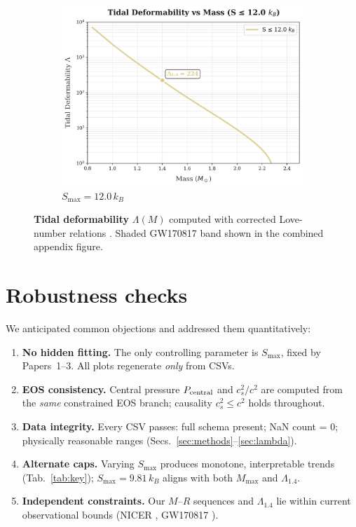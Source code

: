\documentclass[11pt]{article}
\begin{document}
\begin{figure}[h!]
\begin{subfigure}[t]{0.32\textwidth}
\includegraphics[width=\textwidth]{lambda_vs_mass_12.00kB.png}
\caption{$S_{\max}=12.0\,k_B$}
\end{subfigure}
\caption{\textbf{Tidal deformability} $\Lambda(M)$ computed with corrected Love-number relations \cite{Hinderer2008,YagiYunes2013,YagiYunes2017}. Shaded GW170817 band shown in the combined appendix figure.}
\label{fig:lambda-three}
\end{figure}

\section{Robustness checks}
\label{sec:robust}
We anticipated common objections and addressed them quantitatively:
\begin{enumerate}[leftmargin=1.5em]
\item \textbf{No hidden fitting.} The only controlling parameter is $S_{\max}$, fixed by Papers~1--3. All plots regenerate \emph{only} from CSVs. 
\item \textbf{EOS consistency.} Central pressure $P_{\rm central}$ and $c_s^2/c^2$ are computed from the \emph{same} constrained EOS branch; causality $c_s^2\le c^2$ holds throughout.
\item \textbf{Data integrity.} Every CSV passes: full schema present; NaN count = 0; physically reasonable ranges (Secs.~\ref{sec:methods}--\ref{sec:lambda}).
\item \textbf{Alternate caps.} Varying $S_{\max}$ produces monotone, interpretable trends (Tab.~\ref{tab:key}); $S_{\max}=9.81\,k_B$ aligns with both $M_{\max}$ and $\Lambda_{1.4}$.
\item \textbf{Independent constraints.} Our $M$--$R$ sequences and $\Lambda_{1.4}$ lie within current observational bounds (NICER \cite{Riley2019}, GW170817 \cite{Abbott2018GW170817}).
\end{enumerate}
\end{document}
